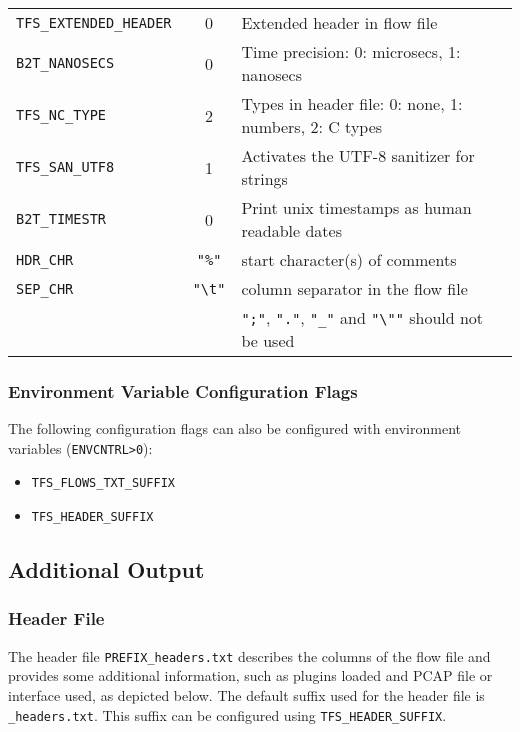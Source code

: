 \documentclass[documentation]{subfiles}
\begin{document}
\begin{longtable}{>{\tt}lcl}
    TFS\_EXTENDED\_HEADER      & 0                & Extended header in flow file\\
    B2T\_NANOSECS              & 0                & Time precision: 0: microsecs, 1: nanosecs\\
    TFS\_NC\_TYPE              & 2                & Types in header file: 0: none, 1: numbers, 2: C types\\
    TFS\_SAN\_UTF8             & 1                & Activates the UTF-8 sanitizer for strings\\
    B2T\_TIMESTR               & 0                & Print unix timestamps as human readable dates\\
    HDR\_CHR                   & {\tt\small "\%"} & start character(s) of comments\\
    SEP\_CHR                   & {\tt\small "\textbackslash{}t"}
                                                  & column separator in the flow file\\
                               &                  & {\tt ";"}, {\tt "."}, {\tt "\_"} and {\tt "\textbackslash""} should not be used\\
    \bottomrule
\end{longtable}

\subsubsection{Environment Variable Configuration Flags}
The following configuration flags can also be configured with environment variables ({\tt ENVCNTRL>0}):
\begin{itemize}
    \item {\tt TFS\_FLOWS\_TXT\_SUFFIX}
    \item {\tt TFS\_HEADER\_SUFFIX}
\end{itemize}

\subsection{Additional Output}

\subsubsection{Header File}\label{s:tfsHeader}
The header file {\tt PREFIX\_headers.txt} describes the columns of the flow file and provides some additional information, such as plugins loaded and PCAP file or interface used, as depicted below. The default suffix used for the header file is {\tt \_headers.txt}. This suffix can be configured using {\tt TFS\_HEADER\_SUFFIX}.
\end{document}
